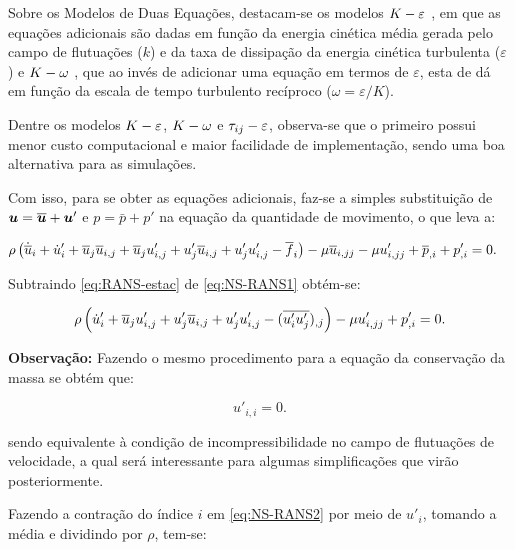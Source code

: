 Sobre os Modelos de Duas Equações, destacam-se os modelos $K-\varepsilon$ \cite{haakansson2012experimental,davidson2014pans,parente2011improved}, em que as equações adicionais são dadas em função da energia cinética média gerada pelo campo de flutuações ($k$) e da taxa de dissipação da energia cinética turbulenta ($\varepsilon$) e $K-\omega$ \cite{larsen2018over,bassi2005discontinuous}, que ao invés de adicionar uma equação em termos de $\varepsilon$, esta de dá em função da escala de tempo turbulento recíproco ($\omega=\varepsilon/K$).

Dentre os modelos $K-\varepsilon$, $K-\omega$ e $\tau_{ij}-\varepsilon$, observa-se que o primeiro possui menor custo computacional e maior facilidade de implementação, sendo uma boa alternativa para as simulações.

Com isso, para se obter as equações adicionais, faz-se a simples substituição de $\boldsymbol{u}=\overline{\boldsymbol{u}}+\boldsymbol{u}'$ e $p=\bar{p}+p'$ na equação da quantidade de movimento, o que leva a:

\begin{equation}
    \begin{split}
        &\rho\left({\dot{\overline{u}}_i+\dot{u}'_i+\overline{u}_j\overline{u}_{i,j}+\overline{u}_ju'_{i,j}+u'_j\overline{u}_{i,j}+u'_ju'_{i,j}-\overline{f}_i}\right)-\mu\overline{u}_{i,jj}-\mu u'_{i,jj}+\overline{p}_{,i}+p'_{,i}=0\text{.}
    \end{split}
    \label{eq:NS-RANS1}
\end{equation}

Subtraindo \ref{eq:RANS-estac} de \ref{eq:NS-RANS1} obtém-se:

\begin{equation}
    \rho\left({\dot{u}'_i+\overline{u}_ju'_{i,j}+u'_j\overline{u}_{i,j}+u'_ju'_{i,j}-(\overline{u'_iu'_j})_{,j}}\right)-\mu u'_{i,jj}+p'_{,i}=0\text{.}
    \label{eq:NS-RANS2}
\end{equation}

\noindent \textbf{Observação:} Fazendo o mesmo procedimento para a equação da conservação da massa se obtém que:

\begin{equation}
    u'_{i,i}=0\text{.}
\end{equation}

\noindent sendo equivalente à condição de incompressibilidade no campo de flutuações de velocidade, a qual será interessante para algumas simplificações que virão posteriormente.

Fazendo a contração do índice $i$ em \ref{eq:NS-RANS2} por meio de $u'_i$, tomando a média e dividindo por $\rho$, tem-se:

